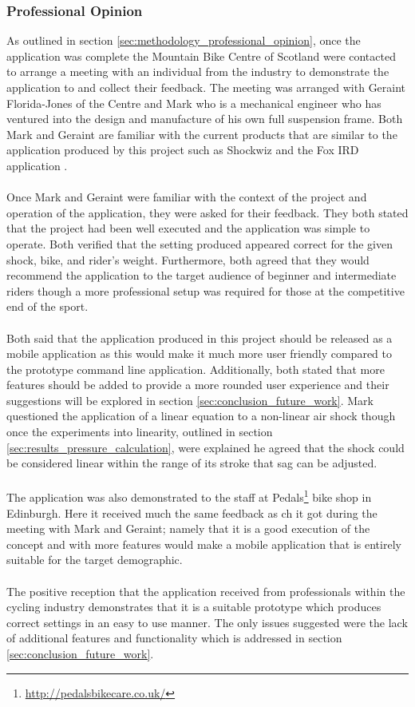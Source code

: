 		\subsubsection{Professional Opinion}
			As outlined in section \ref{sec:methodology_professional_opinion}, once the application was complete the Mountain Bike Centre of Scotland were contacted to arrange a meeting with an individual from the industry to demonstrate the application to and collect their feedback. The meeting was arranged with Geraint Florida-Jones of the Centre and Mark  who is  a mechanical engineer who has ventured into the design and manufacture of his own full suspension frame. Both Mark and Geraint are familiar with the current products that are  similar to the application produced by this project such as Shockwiz \citep{shockwizweb} and the Fox IRD application \citep{foxird}.
			\\\\
			Once Mark and Geraint were familiar with the context of the project and operation of the application, they were asked for their feedback. They both stated that the project had been well executed and the application was simple to operate. Both verified that the setting produced appeared correct for the given shock, bike, and rider’s weight. Furthermore, both agreed that they would recommend the application to the target audience of beginner and intermediate riders though a more professional setup was required for those at the competitive end of the sport.
			\\\\
			Both said  that the application produced in this project should be released as a mobile application as this would make it much more user friendly compared to the prototype command line application. Additionally, both stated that more features should be added to provide a more rounded user experience and their suggestions  will be explored  in section \ref{sec:conclusion_future_work}. Mark questioned the application of a linear equation to a non-linear air shock though once the experiments into linearity, outlined in section \ref{sec:results_pressure_calculation}, were explained he agreed that the shock could be considered linear within the range of its stroke that sag can be adjusted.
			\\\\
			The application was also demonstrated to the staff at Pedals\footnote{\url{http://pedalsbikecare.co.uk/}} bike shop in Edinburgh. Here it  received much the same feedback as ch it got during  the meeting with Mark and Geraint; namely that  it is a good execution of the concept and with more features would make a mobile application that  is entirely suitable for the target demographic. 
			\\\\
			The positive reception that the application received from professionals within the cycling industry demonstrates that it is a suitable prototype which produces correct settings in an easy to use manner. The only issues suggested were the lack of additional features and functionality which is addressed in section \ref{sec:conclusion_future_work}.
